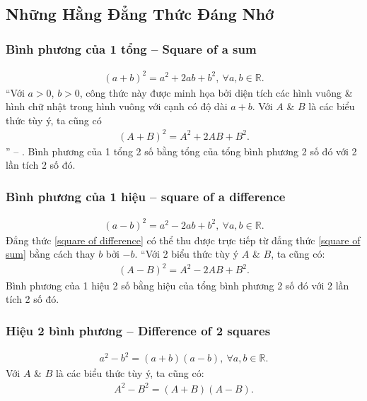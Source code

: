 \documentclass{article}
\numberwithin{equation}{section}
\begin{document}
\subsection{Những Hằng Đẳng Thức Đáng Nhớ}

\subsubsection{Bình phương của 1 tổng -- Square of a sum}
\begin{align}
	\label{square of sum}
	\tag{sos}
	(a + b)^2 = a^2 + 2ab + b^2,\ \forall a,b\in\mathbb{R}.
\end{align}
``Với $a > 0$, $b > 0$, công thức này được minh họa bởi diện tích các hình vuông \& hình chữ nhật trong hình vuông với cạnh có độ dài $a + b$. Với $A$ \& $B$ là các biểu thức tùy ý, ta cũng có
\begin{align*}
	(A + B)^2 = A^2 + 2AB + B^2.
\end{align*}
'' -- \cite[p. 9]{SGK_Toan_8_tap_1}. Bình phương của 1 tổng 2 số bằng tổng của tổng bình phương 2 số đó với 2 lần tích 2 số đó.

\subsubsection{Bình phương của 1 hiệu -- square of a difference}
\begin{align}
	\label{square of difference}
	\tag{sod}
	(a - b)^2 = a^2 - 2ab + b^2,\ \forall a,b\in\mathbb{R}.
\end{align}
Đẳng thức \eqref{square of difference} có thể thu được trực tiếp từ đẳng thức \eqref{square of sum} bằng cách thay $b$ bởi $-b$. ``Với 2 biểu thức tùy ý $A$ \& $B$, ta cũng có:
\begin{align*}
	(A - B)^2 = A^2 - 2AB + B^2.
\end{align*}
Bình phương của 1 hiệu 2 số bằng hiệu của tổng bình phương 2 số đó với 2 lần tích 2 số đó. 

\subsubsection{Hiệu 2 bình phương -- Difference of 2 squares}
\begin{align}
	a^2 - b^2 = (a + b)(a - b),\ \forall a,b\in\mathbb{R}.
\end{align}
Với $A$ \& $B$ là các biểu thức tùy ý, ta cũng có:
\begin{align}
	A^2 - B^2 = (A + B)(A - B).
\end{align}
\end{document}
